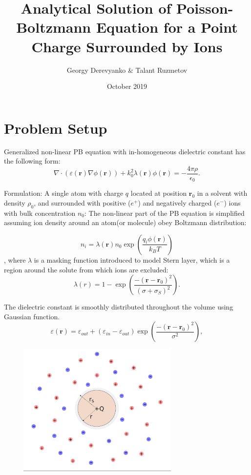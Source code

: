 \documentclass{article}
\title{Analytical Solution of Poisson-Boltzmann Equation for a Point Charge Surrounded by Ions}
\author{Georgy Derevyanko & Talant Ruzmetov }
\date{October 2019}
\begin{document}
\maketitle

\section{Problem Setup}

Generalized non-linear PB equation with in-homogeneous dielectric constant has the following form:
\begin{equation}
  \label{eq:GPB}
  \nabla \cdot \left( \varepsilon(\mathbf{r}) \nabla \phi(\mathbf{r}) \right) +
  k_{0}^2 \lambda(\mathbf{r}) \phi(\mathbf{r}) = -\frac{4\pi \rho}{\epsilon_0}.   
\end{equation}

Formulation:
A single atom with charge $q$ located at position $\mathbf{r}_0$ in a solvent with density $\rho_0$, and
surrounded with positive ($e^{+}$) and negatively charged ($e^{-}$) ions with bulk concentration $n_0$:
The non-linear part of the PB equation is simplified assuming ion density around an atom(or molecule) obey
Boltzmann distribution:


\begin{equation}
  \label{eq:BoltzDist}
    n_{i} = \lambda(\mathbf{r}) n_0 \exp \left(\frac{ q_i \phi(\mathbf{r})}{k_B T} \right) 
\end{equation}
, where $\lambda$ is a masking function introduced to model Stern layer, which is a region around the solute
from which ions are excluded:
\begin{equation}
  \label{eq:MaskF}
    \lambda(r) = 1 - \exp\left( \frac{-(\mathbf{r}-\mathbf{r}_0)^2}{(\sigma+\sigma_{S})^2} \right).
\end{equation}

The dielectric constant is smoothly distributed throughout the volume using Gaussian function.
\begin{equation}
  \label{eq:GaussEps}
    \varepsilon(\mathbf{r}) = \varepsilon_{out} + (\varepsilon_{in} - \varepsilon_{out})\exp\left( \frac{-(\mathbf{r}-\mathbf{r}_0)^2}{\sigma^2} \right),
\end{equation}


%
\begin{figure}
  \begin{centering}
    \includegraphics[width=8.0cm]{Figure1.png}
    \caption{ }
    \label{fig:phi_r}
  \end{centering}
\end{figure}
%
\end{document}
